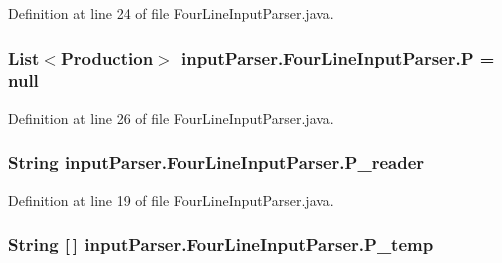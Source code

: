 Definition at line 24 of file Four\-Line\-Input\-Parser.\-java.

\hypertarget{classinput_parser_1_1_four_line_input_parser_a25cb1cc11bda9a906f0a29eb66444c76}{
\subsubsection[{P}]{\setlength{\rightskip}{0pt plus 5cm}List$<${\bf Production}$>$ {\bf input\-Parser.\-Four\-Line\-Input\-Parser.\-P} = null}}\label{classinput_parser_1_1_four_line_input_parser_a25cb1cc11bda9a906f0a29eb66444c76}


Definition at line 26 of file Four\-Line\-Input\-Parser.\-java.

\hypertarget{classinput_parser_1_1_four_line_input_parser_a72862efdd54896c843b7ad5677f33515}{
\subsubsection[{P\-\_\-reader}]{\setlength{\rightskip}{0pt plus 5cm}String {\bf input\-Parser.\-Four\-Line\-Input\-Parser.\-P\-\_\-reader}}}\label{classinput_parser_1_1_four_line_input_parser_a72862efdd54896c843b7ad5677f33515}


Definition at line 19 of file Four\-Line\-Input\-Parser.\-java.

\hypertarget{classinput_parser_1_1_four_line_input_parser_adb2b6b325e8bc451ba7b46270ba4dea8}{
\subsubsection[{P\-\_\-temp}]{\setlength{\rightskip}{0pt plus 5cm}String \mbox{[}$\,$\mbox{]} {\bf input\-Parser.\-Four\-Line\-Input\-Parser.\-P\-\_\-temp}}}\label{classinput_parser_1_1_four_line_input_parser_adb2b6b325e8bc451ba7b46270ba4dea8}


